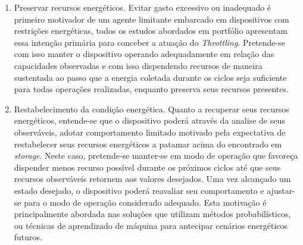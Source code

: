 \begin{enumerate}
	\item Preservar recursos energéticos. 
	Evitar gasto excessivo ou inadequado é primeiro motivador de um agente limitante embarcado em dispositivos com restrições energéticas, todos os estudos abordados em portfólio apresentam essa intenção primária para conceber a atuação do \textit{Throttling}. Pretende-se com isso manter o dispositivo operando adequadamente em relação das capacidades observadas e com isso dispendendo recursos de maneira sustentada ao passo que a energia coletada durante os ciclos seja suficiente para todas operações realizadas, enquanto preserva seus recursos presentes.
	
	\item Restabelecimento da condição energética.
	Quanto a recuperar seus recursos energéticos, entende-se que o dispositivo poderá através da analise de seus observáveis, adotar comportamento limitado motivado pela expectativa de restabelecer seus recursos energéticos a patamar acima do encontrado em \textit{storage}. Neste caso, pretende-se manter-se em modo de operação que favoreça dispender menos recurso possível durante os próximos ciclos até que seus recursos observáveis retornem aos valores desejados. Uma vez alcançado um estado desejado, o dispositivo poderá reavaliar seu comportamento e ajustar-se para o modo de operação considerado adequado. Esta motivação é principalmente abordada nas soluções que utilizam métodos probabilísticos, ou técnicas de aprendizado de máquina para antecipar cenários energéticos futuros.
\end{enumerate}











